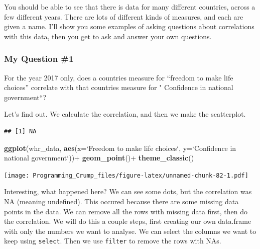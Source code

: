 \documentclass[]{book}
\newenvironment{Shaded}{\begin{snugshade}}{\end{snugshade}}
\newcommand{\KeywordTok}[1]{\textcolor[rgb]{0.13,0.29,0.53}{\textbf{{#1}}}}
\newcommand{\DataTypeTok}[1]{\textcolor[rgb]{0.13,0.29,0.53}{{#1}}}
\newcommand{\StringTok}[1]{\textcolor[rgb]{0.31,0.60,0.02}{{#1}}}
\newcommand{\NormalTok}[1]{{#1}}
\theoremstyle{definition}
\theoremstyle{definition}
\theoremstyle{definition}
\theoremstyle{remark}
\begin{document}
You should be able to see that there is data for many different
countries, across a few different years. There are lots of different
kinds of measures, and each are given a name. I'll show you some
examples of asking questions about correlations with this data, then you
get to ask and answer your own questions.

\subsubsection{My Question \#1}\label{my-question-1}

For the year 2017 only, does a countries measure for ``freedom to make
life choices'' correlate with that countries measure for " Confidence in
national government``?

Let's find out. We calculate the correlation, and then we make the
scatterplot.

\begin{Shaded}
\end{Shaded}

\begin{verbatim}
## [1] NA
\end{verbatim}

\begin{Shaded}
\begin{Highlighting}[]
\KeywordTok{ggplot}\NormalTok{(whr_data, }\KeywordTok{aes}\NormalTok{(}\DataTypeTok{x=}\StringTok{`}\DataTypeTok{Freedom to make life choices}\StringTok{`}\NormalTok{,}
                     \DataTypeTok{y=}\StringTok{`}\DataTypeTok{Confidence in national government}\StringTok{`}\NormalTok{))+}
\StringTok{  }\KeywordTok{geom_point}\NormalTok{()+}
\StringTok{  }\KeywordTok{theme_classic}\NormalTok{()}
\end{Highlighting}
\end{Shaded}

\texttt{[image: Programming\_Crump\_files/figure-latex/unnamed-chunk-82-1.pdf]}

Interesting, what happened here? We can see some dots, but the
correlation was NA (meaning undefined). This occured because there are
some missing data points in the data. We can remove all the rows with
missing data first, then do the correlation. We will do this a couple
steps, first creating our own data.frame with only the numbers we want
to analyse. We can select the columns we want to keep using
\texttt{select}. Then we use \texttt{filter} to remove the rows with
NAs.
\end{document}
